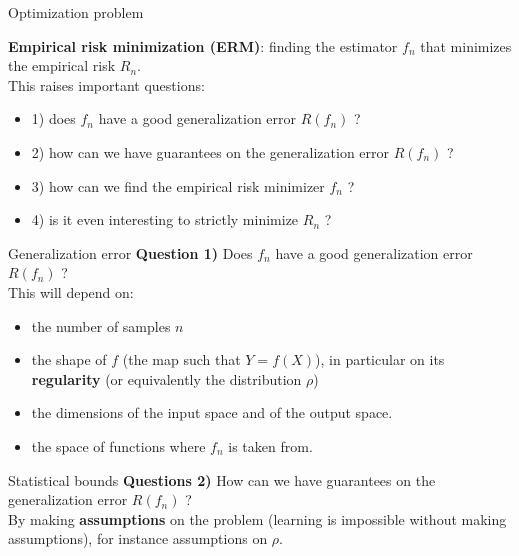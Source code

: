 \documentclass[usenames,dvipsnames]{beamer}
\begin{document}
\begin{frame}{Optimization problem}

    \textbf{Empirical risk minimization (ERM)}: finding the estimator $f_n$ that minimizes the empirical risk $R_n$.
    \\

    This raises important questions:
    \begin{itemize}
	\item 1) does $f_n$ have a good generalization error $R(f_n)$ ?
	\item 2) how can we have guarantees on the generalization error $R(f_n)$ ?
	\item 3) how can we find the empirical risk minimizer $f_n$ ?
	\item 4) is it even interesting to strictly minimize $R_n$ ?
    \end{itemize}
\end{frame}

\begin{frame}{Generalization error}
    \textbf{Question 1)} {\color{Blue}Does $f_n$ have a good generalization error $R(f_n)$ ?}
    \\

    This will depend on:
    \begin{itemize}
	\item the number of samples $n$
	\item the shape of $f$ (the map such that $Y=f(X)$), in particular on its \textbf{regularity} (or equivalently the distribution $\rho$)
	\item the dimensions of the input space and of the output space.
	\item the space of functions where $f_n$ is taken from.
    \end{itemize}
\end{frame}

\begin{frame}{Statistical bounds}
    \textbf{Questions 2)} {\color{Blue}How can we have guarantees on the generalization error $R(f_n)$ ?}
    \\

    By making \textbf{assumptions} on the problem (learning is impossible without making assumptions), for instance assumptions on $\rho$.
\end{frame}
\end{document}
